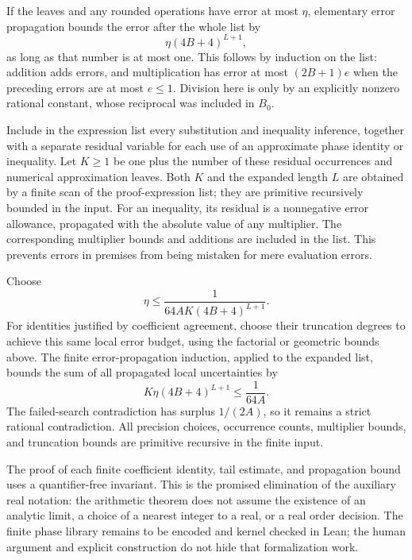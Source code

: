 \documentclass[11pt]{article}
\theoremstyle{definition}\newtheorem{definition}[theorem]{Definition}
\theoremstyle{remark}\newtheorem{remark}[theorem]{Remark}
\begin{document}
If the leaves and any rounded operations have error at most $\eta$, elementary error propagation bounds the error after the whole list by
\[
 \eta(4B+4)^{L+1},
\]
as long as that number is at most one. This follows by induction on the list: addition adds errors, and multiplication has error at most $(2B+1)e$ when the preceding errors are at most $e\le1$. Division here is only by an explicitly nonzero rational constant, whose reciprocal was included in $B_0$.

Include in the expression list every substitution and inequality inference, together with a separate residual variable for each use of an approximate phase identity or inequality. Let $K\ge1$ be one plus the number of these residual occurrences and numerical approximation leaves. Both $K$ and the expanded length $L$ are obtained by a finite scan of the proof-expression list; they are primitive recursively bounded in the input. For an inequality, its residual is a nonnegative error allowance, propagated with the absolute value of any multiplier. The corresponding multiplier bounds and additions are included in the list. This prevents errors in premises from being mistaken for mere evaluation errors.

Choose
\[
 \eta\le\frac1{64AK(4B+4)^{L+1}}.
\]
For identities justified by coefficient agreement, choose their truncation degrees to achieve this same local error budget, using the factorial or geometric bounds above. The finite error-propagation induction, applied to the expanded list, bounds the sum of all propagated local uncertainties by
\[
 K\eta(4B+4)^{L+1}\le\frac1{64A}.
\]
The failed-search contradiction has surplus $1/(2A)$, so it remains a strict rational contradiction. All precision choices, occurrence counts, multiplier bounds, and truncation bounds are primitive recursive in the finite input.

The proof of each finite coefficient identity, tail estimate, and propagation bound uses a quantifier-free invariant. This is the promised elimination of the auxiliary real notation: the arithmetic theorem does not assume the existence of an analytic limit, a choice of a nearest integer to a real, or a real order decision. The finite phase library remains to be encoded and kernel checked in Lean; the human argument and explicit construction do not hide that formalization work.
\end{document}
